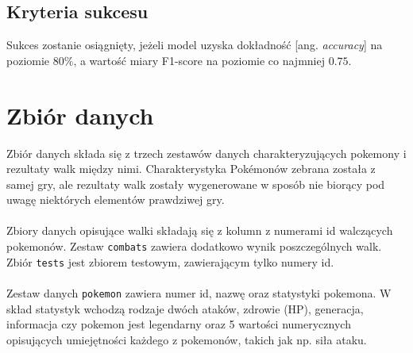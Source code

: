\documentclass[12pt, a4paper]{report}
\begin{document}
\subsection{Kryteria sukcesu}
Sukces zostanie osiągnięty, jeżeli model uzyska dokładność [ang. \textit{accuracy}] na poziomie \(80\%\), a wartość miary F1-score na poziomie co najmniej \(0.75\).

\section{Zbiór danych}

Zbiór danych składa się z trzech zestawów danych charakteryzujących pokemony i rezultaty walk między nimi. Charakterystyka Pokémonów zebrana została z samej gry, ale rezultaty walk zostały wygenerowane w sposób nie biorący pod uwagę niektórych elementów prawdziwej gry.\\\\
\noindent
Zbiory danych opisujące walki składają się z kolumn z numerami id walczących pokemonów. Zestaw \texttt{combats} zawiera dodatkowo wynik poszczególnych walk. Zbiór \texttt{tests} jest zbiorem testowym, zawierającym tylko numery id.\\\\
\noindent
Zestaw danych \texttt{pokemon} zawiera numer id, nazwę oraz statystyki pokemona. W skład statystyk wchodzą rodzaje dwóch ataków, zdrowie (HP), generacja, informacja czy pokemon jest legendarny oraz 5 wartości numerycznych opisujących umiejętności każdego z pokemonów, takich jak np. siła ataku.
\end{document}
